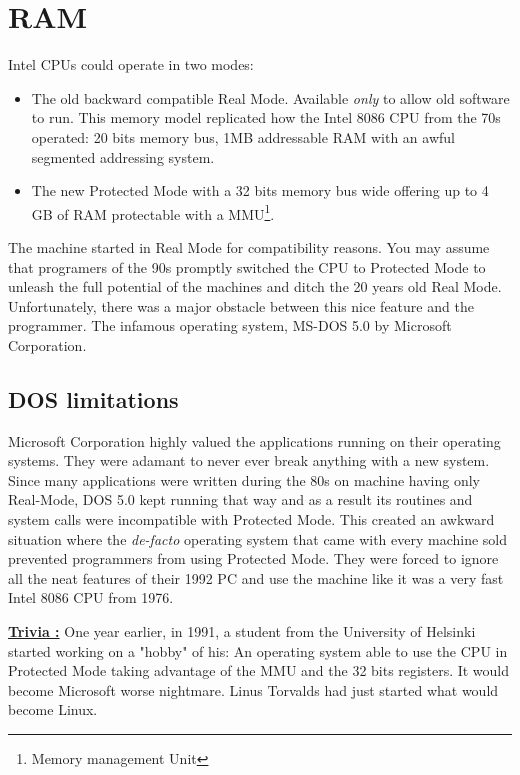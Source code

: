 \documentclass[book.tex]{subfiles}
\begin{document}
\section{RAM}
Intel CPUs could operate in two modes:
\begin{itemize}
  \item The old backward compatible Real Mode. Available \emph{only} to allow old software to run. This memory model replicated how the Intel 8086 CPU from the 70s operated: 20 bits memory bus, 1MB addressable RAM with an awful segmented addressing system.
  \item The new Protected Mode with a 32 bits memory bus wide offering up to 4 GB of RAM protectable with a MMU\footnote{Memory management Unit}.
\end{itemize}
The machine started in Real Mode for compatibility reasons. You may assume that programers of the 90s promptly switched the CPU to Protected Mode to unleash the full potential of the machines and ditch the 20 years old Real Mode. Unfortunately, there was a major obstacle between this nice feature and the programmer. The infamous operating system, MS-DOS 5.0 by Microsoft Corporation.
  






  \subsection{DOS limitations}
  Microsoft Corporation highly valued the applications running on their operating systems. They were adamant to never ever break anything with a new system.  Since many applications were written during the 80s on machine having only Real-Mode, DOS 5.0 kept running that way and as a result its routines and system calls were incompatible with Protected Mode. This created an awkward situation where the \emph{de-facto} operating system that came with every machine sold prevented programmers from using Protected Mode. They were forced to ignore all the neat features of their 1992 PC and use the machine like it was a very fast Intel 8086 CPU from 1976.

\bigskip

 \textbf{\underline{Trivia :}} One year earlier, in 1991, a student from the University of Helsinki started working on a "hobby" of his: An operating system able to use the CPU in Protected Mode taking advantage of the MMU and the 32 bits registers. It would become Microsoft worse nightmare. Linus Torvalds had just started what would become Linux.
\end{document}
